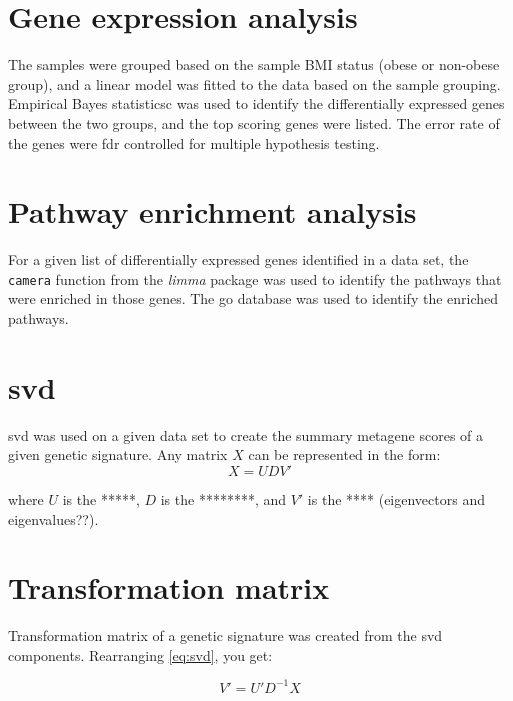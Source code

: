 \section{Gene expression analysis}
\label{sec:gene_expression_analysis}

The samples were grouped based on the sample BMI status (obese or non-obese group), and a linear model was fitted to the data based on the sample grouping.
Empirical Bayes statisticsc was used to identify the differentially expressed genes between the two groups, and the top scoring genes were listed.
The error rate of the genes were \gls{fdr} controlled for multiple hypothesis testing.

\section{Pathway enrichment analysis}
\label{sec:pathway_enrichment_analysis}

For a given list of differentially expressed genes identified in a data set, the \texttt{camera} function from the \textit{limma} package was used to identify the pathways that were enriched in those genes.
The \gls{go} database was used to identify the enriched pathways.

\section{\gls{svd}}
\label{sec:singular_value_decomposition}

\gls{svd} was used on a given data set to create the summary metagene scores of a given genetic signature.
Any matrix $X$ can be represented in the form:
\begin{equation}
	\label{eq:svd}
	X = UDV'
\end{equation}

\noindent
where $U$ is the *****, $D$ is the ********, and $V'$ is the **** (eigenvectors and eigenvalues??).

\section{Transformation matrix}
\label{sec:transformation_matrix}

Transformation matrix of a genetic signature was created from the \gls{svd} components.
Rearranging \cref{eq:svd}, you get:

\begin{equation}
	\label{eq:transmat}
	V' = U'D^{-1}X
\end{equation}

